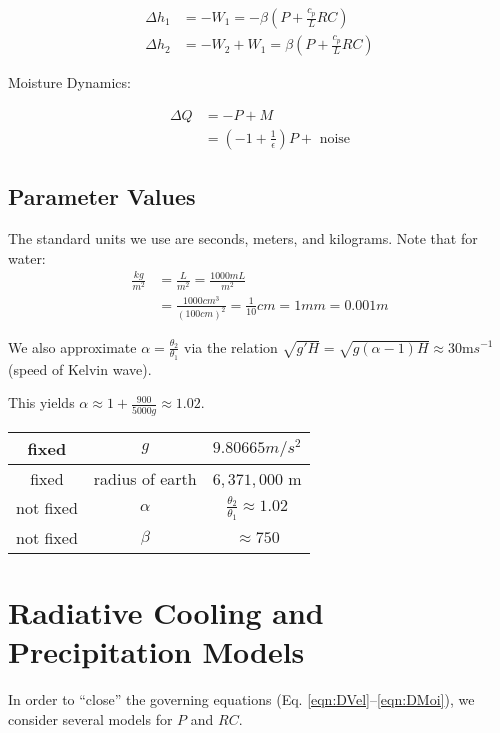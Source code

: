 \documentclass[10pt]{article}
\begin{document}
\begin{align}
\Delta h_1 &= -W_1 = -\beta \left(P + \frac{c_p}{L}RC\right)\\
\Delta h_2 &= -W_2 + W_1 = \beta \left(P + \frac{c_p}{L}RC\right)
\label{eqn:DHei}
\end{align}

Moisture Dynamics:

\begin{align}
\Delta Q &= -P + M\\
&= \left(-1 + \frac{1}{\epsilon} \right)P+ \text{ noise}
\label{eqn:DMoi}
\end{align}

\subsection{Parameter Values}
The standard units we use are seconds, meters, and kilograms. Note that for water:
\begin{align*}
\frac{kg}{m^2} &= \frac{L}{m^2} = \frac{1000 mL}{m^2}\\
&= \frac{1000 cm^3}{ (100cm)^2} = \frac{1}{10} cm = 1 mm = 0.001 m 
\end{align*}

We also approximate $\alpha = \frac{\theta_2}{\theta_1}$ via the relation $\sqrt{g'H} = \sqrt{g(\alpha -1) H} \approx 30 $m$s^{-1}$ (speed of Kelvin wave).

This yields $\alpha \approx 1+\frac{900}{5000g} \approx 1.02$.


\begin{center}
	\begin{tabular}{||c |c|c|| } 
		\hline
		fixed & $g$  & $9.80665 m/s^2$ \\  \hline
		fixed & radius of earth & $6,371,000$ m \\ \hline
		not fixed & $\alpha$  & $\frac{\theta_2}{\theta_1}\approx 1.02$ \\ \hline
		not fixed & $\beta$ &  $\approx 750$ \\ \hline
	\end{tabular}
\end{center}

\section{Radiative Cooling and Precipitation Models}
In order to ``close'' the governing equations (Eq. \ref{eqn:DVel}--\ref{eqn:DMoi}), we consider several models for $P$ and $RC$.
\end{document}
